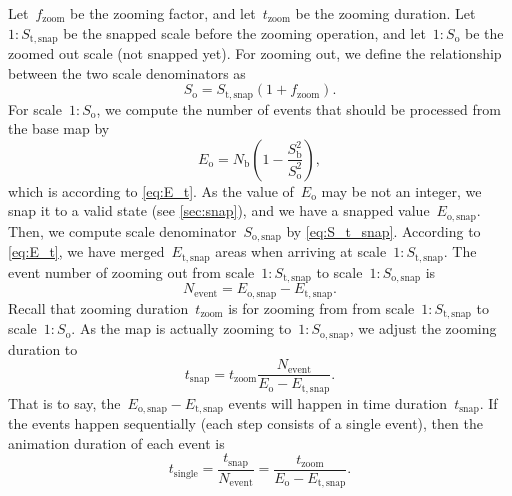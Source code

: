 \documentclass[]{interact}
\begin{document}
Let~$f_\mathrm{zoom}$ be the zooming factor, and 
let~$t_\mathrm{zoom}$ be the zooming duration.
Let~$1:S_\mathrm{t,snap}$ be the snapped scale before the zooming operation, and 
let~$1:S_\mathrm{o}$ be the zoomed out scale (not snapped yet).
For zooming out, we define the relationship 
between the two scale denominators as
\begin{equation}
\label{eq:S_o}
S_\mathrm{o} = S_\mathrm{t,snap} (1 + f_\mathrm{zoom}).
\end{equation}
For scale~$1:S_\mathrm{o}$, we compute the number of events
that should be processed from the base map by
\begin{equation*}
\label{eq:E_o}
E_\mathrm{o} = N_\mathrm{b} \left(1-\frac{S^2_\mathrm{b}}{S^2_\mathrm{o}}\right),
\end{equation*}
which is according to \eq\ref{eq:E_t}.
As the value of~$E_\mathrm{o}$ may be not an integer, 
we snap it to a valid state
(see \sect\ref{sec:snap}),
and we have a snapped value~$E_\mathrm{o,snap}$.
Then, we compute scale denominator~$S_\mathrm{o,snap}$
by \eq\ref{eq:S_t_snap}.
According to \eq\ref{eq:E_t}, we have merged~$E_\mathrm{t,snap}$ areas 
when arriving at scale~$1:S_\mathrm{t,snap}$.
The event number of zooming out
from scale~$1:S_\mathrm{t,snap}$ to scale~$1:S_\mathrm{o,snap}$ is
\begin{equation*}
\label{eq:N_event}
N_\mathrm{event} = 
E_\mathrm{o,snap} - E_\mathrm{t,snap}.
\end{equation*}
Recall that zooming duration~$t_\mathrm{zoom}$ is for zooming from 
from scale~$1:S_\mathrm{t,snap}$ to scale~$1:S_\mathrm{o}$.
As the map is actually zooming to~$1:S_\mathrm{o,snap}$,
we adjust the zooming duration to
\begin{equation*}
\label{eq:E_i}
t_\mathrm{snap}= t_\mathrm{zoom} 
\frac{N_\mathrm{event}}
{E_\mathrm{o} - E_\mathrm{t,snap}}.
\end{equation*}
That is to say, the~$E_\mathrm{o,snap} - E_\mathrm{t,snap}$ events will happen 
in time duration~$t_\mathrm{snap}$.
If the events happen sequentially (each step consists of a single event), 
then the animation duration of each event is
\begin{equation}
\label{eq:t_single}
t_\mathrm{single}   = \frac{t_\mathrm{snap}}{N_\mathrm{event}} 
                    = \frac{t_\mathrm{zoom}}{E_\mathrm{o} - E_\mathrm{t,snap}}.
\end{equation}
\end{document}
